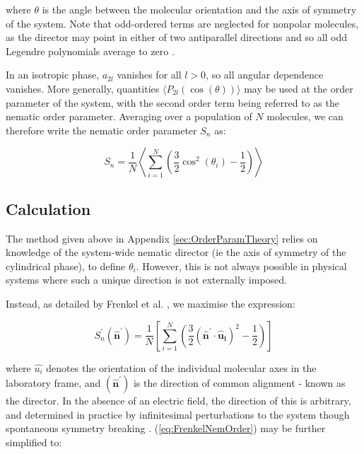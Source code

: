 \documentclass[11pt, a4paper]{article} %
\begin{document}
\begin{appendices}
where $\theta$ is the angle between the molecular orientation and the axis of symmetry of the system. Note that odd-ordered terms are neglected for nonpolar molecules, as the director may point in either of two antiparallel directions and so all odd Legendre polynomials average to zero \cite{Parsons1979}.

In an isotropic phase, $a_{2l}$ vanishes for all $l>0$, so all angular dependence vanishes. More generally,  quantities $\langle P_{2l}(\cos(\theta)) \rangle$ may be used at the order parameter of the system, with the second order term being referred to as the nematic order parameter. Averaging over a population of $N$ molecules, we can therefore write the nematic order parameter $S_{n}$ as:

\begin{equation}
S_{n} = \frac{1}{N} \left\langle \sum_{i=1}^{N} \left( \frac{3}{2} \cos^{2}(\theta_{i})-\frac{1}{2} \right) \right\rangle
\end{equation}

\subsection{Calculation}\label{sec:OrderParamCalc}
The method given above in Appendix \ref{sec:OrderParamTheory} relies on knowledge of the system-wide nematic director (ie the axis of symmetry of the cylindrical phase), to define $\theta_{i}$. However, this is not always possible in physical systems where such a unique direction is not externally imposed.

Instead, as detailed by Frenkel et al. \cite{Frenkel1985}, we maximise the expression:

\begin{equation} \label{eq:FrenkelNemOrder}
S^{\prime}_{n}(\boldsymbol{\hat{n}^{\prime}}) = \frac{1}{N} \left[ \sum_{i=1}^{N} \left( \frac{3}{2} (\boldsymbol{\hat{n}^{\prime}} \cdot \boldsymbol{\hat{u}_{i}})^{2}-\frac{1}{2} \right) \right]
\end{equation}

where $\hat{u_{i}}$ denotes the orientation of the individual molecular axes in the laboratory frame, and $(\boldsymbol{\hat{n}^{\prime}})$ is the direction of common alignment - known as the director. In the absence of an electric field, the direction of this is arbitrary, and determined in practice by infinitesimal perturbations to the system though spontaneous symmetry breaking \cite{Forster2018}. (\ref{eq:FrenkelNemOrder}) may be further simplified to:


\end{appendices}
\end{document}
